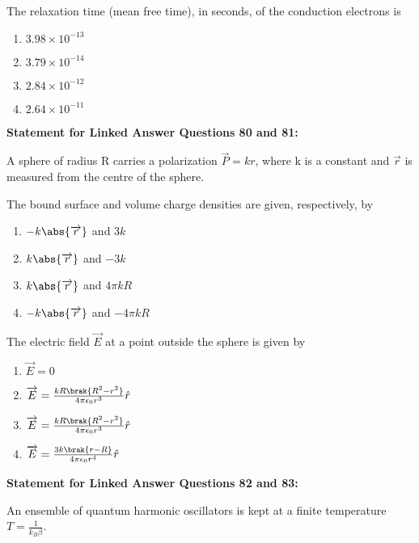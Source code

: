 \item The relaxation time (mean free time), in seconds, of the conduction electrons is
\begin{multicols}{4}
\begin{enumerate}
\item $3.98\times10^{-13}$
\item $3.79\times10^{-14}$
\item $2.84\times10^{-12}$
\item $2.64\times10^{-11}$
\end{enumerate}
\end{multicols}
    \textbf{Statement for Linked Answer Questions 80 and 81:}

A sphere of radius R carries a polarization $\overrightarrow{P}=kr$, where k is a constant and $\overrightarrow{r}$ is measured from the centre of the sphere.

\item The bound surface and volume charge densities are given, respectively, by
\begin{multicols}{2}
\begin{enumerate}
\item $-k\abs{\overrightarrow{r}}$ and $3k$
\item $k\abs{\overrightarrow{r}}$ and $-3k$
\item $k\abs{\overrightarrow{r}}$ and $4\pi kR$
\item $-k\abs{\overrightarrow{r}}$ and $-4\pi kR$
\end{enumerate}
\end{multicols}

\item The electric field $\overrightarrow{E}$ at a point outside the sphere is given by
\begin{multicols}{4}
\begin{enumerate}
\item $\overrightarrow{E}=0$
\item $\overrightarrow{E}=\frac{kR\brak{R^2-r^2}}{4\pi\epsilon_0r^3}\hat{r}$
\item $\overrightarrow{E}=\frac{kR\brak{R^2-r^2}}{4\pi\epsilon_0r^3}\hat{r}$
\item $\overrightarrow{E}=\frac{3k\brak{r-R}}{4\pi\epsilon_0r^4}\hat{r}$
\end{enumerate}
\end{multicols}

    \textbf{Statement for Linked Answer Questions 82 and 83:}

An ensemble of quantum harmonic oscillators is kept at a finite temperature $T=\frac{1}{k_B\beta}$.

